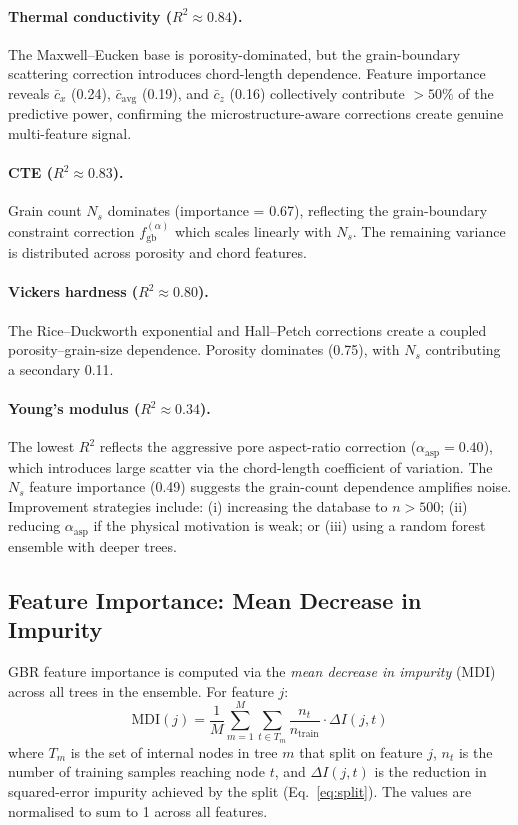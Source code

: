 \documentclass[11pt,a4paper]{article}
\begin{document}
\paragraph{Thermal conductivity ($R^2 \approx 0.84$).}
The Maxwell--Eucken base is porosity-dominated, but the grain-boundary scattering correction introduces chord-length dependence. Feature importance reveals $\bar{c}_x$ (0.24), $\bar{c}_{\text{avg}}$ (0.19), and $\bar{c}_z$ (0.16) collectively contribute $> 50\%$ of the predictive power, confirming the microstructure-aware corrections create genuine multi-feature signal.

\paragraph{CTE ($R^2 \approx 0.83$).}
Grain count $N_s$ dominates (importance = 0.67), reflecting the grain-boundary constraint correction $f_{\text{gb}}^{(\alpha)}$ which scales linearly with $N_s$. The remaining variance is distributed across porosity and chord features.

\paragraph{Vickers hardness ($R^2 \approx 0.80$).}
The Rice--Duckworth exponential and Hall--Petch corrections create a coupled porosity--grain-size dependence. Porosity dominates (0.75), with $N_s$ contributing a secondary 0.11.

\paragraph{Young's modulus ($R^2 \approx 0.34$).}
The lowest $R^2$ reflects the aggressive pore aspect-ratio correction ($\alpha_{\text{asp}} = 0.40$), which introduces large scatter via the chord-length coefficient of variation. The $N_s$ feature importance (0.49) suggests the grain-count dependence amplifies noise. Improvement strategies include: (i) increasing the database to $n > 500$; (ii) reducing $\alpha_{\text{asp}}$ if the physical motivation is weak; or (iii) using a random forest ensemble with deeper trees.

\subsection{Feature Importance: Mean Decrease in Impurity}
\label{sec:importance}

GBR feature importance is computed via the \emph{mean decrease in impurity} (MDI) across all trees in the ensemble. For feature $j$:
\begin{equation}
    \text{MDI}(j) = \frac{1}{M} \sum_{m=1}^{M} \sum_{t \in T_m} \frac{n_t}{n_{\text{train}}} \cdot \Delta I(j, t)
\end{equation}
where $T_m$ is the set of internal nodes in tree $m$ that split on feature $j$, $n_t$ is the number of training samples reaching node $t$, and $\Delta I(j,t)$ is the reduction in squared-error impurity achieved by the split (Eq.~\ref{eq:split}). The values are normalised to sum to 1 across all features.
\end{document}
